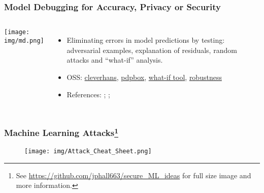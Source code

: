 \documentclass[11pt,
               aspectratio=169,
               hyperref={colorlinks}
               ]{beamer}
\begin{document}
			\begin{frame}
		
				\frametitle{Model Debugging for Accuracy, Privacy or Security}		
			
				\begin{columns}
	
					\centering
					\texttt{[image: img/md.png]}
				
					\vspace{-5pt}
					\scriptsize
					{\begin{itemize}
						\item Eliminating errors in model predictions by testing: adversarial examples, explanation of residuals, random attacks and ``what-if'' analysis.
						\item OSS: \href{https://github.com/tensorflow/cleverhans}{cleverhans}, \href{https://github.com/SauceCat/PDPbox}{pdpbox}, \href{https://pair-code.github.io/what-if-tool/index.html}{what-if tool},
						\href{https://github.com/MadryLab/robustness}{robustness}
						\item References: ; ; 
					\end{itemize}}
					\normalsize
				
				\end{columns}			
			
			\end{frame}
			
			\begin{frame}	
			
				\frametitle{Machine Learning Attacks\footnote{\tiny{See \url{https://github.com/jphall663/secure_ML_ideas} for full size image and more information.}}}		
			
				\begin{figure}[htb]
					\begin{center}
						\texttt{[image: img/Attack\_Cheat\_Sheet.png]}
					\end{center}
				\end{figure}	
			\end{frame}
			
\end{document}
